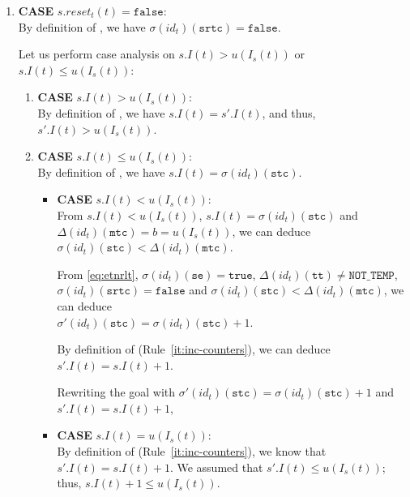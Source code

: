 \documentclass[dvipsnames,12pt]{article}
\begin{document}
\begin{niproof}
\begin{enumerate}
\begin{enumerate}
\begin{enumerate}
        \item \textbf{CASE} $s.reset_t(t)=\mathtt{false}$:\\
          
          By definition of \upSim, we have
          $\sigma(id_t)(\texttt{srtc})=\mathtt{false}$.

          Let us perform case analysis on $s.I(t)>u(I_s(t))$ or
          $s.I(t)\le{}u(I_s(t))$:
          \begin{enumerate}
          \item \textbf{CASE} $s.I(t)>u(I_s(t))$:\\
            
            By definition of \dwSitpn, we have $s.I(t)=s'.I(t)$, and
            thus, $s'.I(t)>u(I_s(t))$. 
            
          \item \textbf{CASE} $s.I(t)\le{}u(I_s(t))$:\\
            
            By definition of \upSim, we have
            $s.I(t)=\sigma(id_t)(\texttt{stc})$.

            \begin{itemize}
            \item \textbf{CASE} $s.I(t)<u(I_s(t))$:\\
              From $s.I(t)<u(I_s(t))$,
              $s.I(t)=\sigma(id_t)(\texttt{stc})$ and\\
              $\Delta(id_t)(\texttt{mtc})=b=u(I_s(t))$, we can deduce
              $\sigma(id_t)(\texttt{stc})<\Delta(id_t)(\texttt{mtc})$.

              From \eqref{eq:etnrlt},
              $\sigma(id_t)(\texttt{se})=\mathtt{true}$,
              $\Delta(id_t)(\texttt{tt})\neq\mathtt{NOT\_TEMP}$,
              $\sigma(id_t)(\texttt{srtc})=\mathtt{false}$ and
              $\sigma(id_t)(\texttt{stc})<\Delta(id_t)(\texttt{mtc})$, we can deduce\\
              $\sigma'(id_t)(\texttt{stc})=\sigma(id_t)(\texttt{stc})+1$.

              By definition of \dwSitpn (Rule~\ref{it:inc-counters}),
              we can deduce $s'.I(t)=s.I(t)+1$.

              Rewriting the goal with
              $\sigma'(id_t)(\texttt{stc})=\sigma(id_t)(\texttt{stc})+1$ and
              $s'.I(t)=s.I(t)+1$, 
              
            \item \textbf{CASE} $s.I(t)=u(I_s(t))$:\\
              By definition of \dwSitpn (Rule~\ref{it:inc-counters}),
              we know that $s'.I(t)=s.I(t)+1$. We assumed that
              $s'.I(t)\le{}u(I_s(t))$; thus,
              $s.I(t)+1\le{}u(I_s(t))$.


\end{itemize}
\end{enumerate}
\end{enumerate}
\end{enumerate}
\end{enumerate}
\end{niproof}
\end{document}
